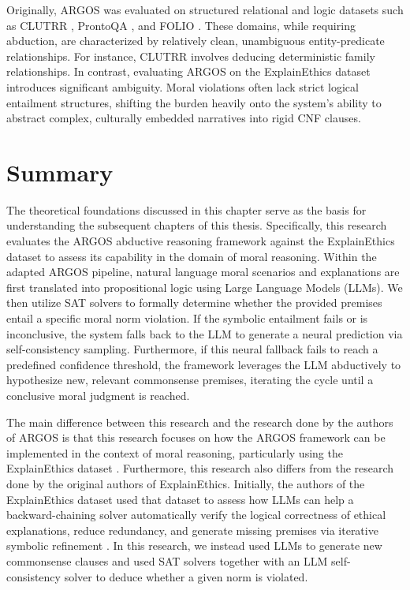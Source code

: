 Originally, ARGOS was evaluated on structured relational and logic datasets such as CLUTRR \citep{sinha-etal-2019-clutrr}, ProntoQA \citep{PrOntoQA}, and FOLIO \citep{han-etal-2024-folio}. These domains, while requiring abduction, are characterized by relatively clean, unambiguous entity-predicate relationships. For instance, CLUTRR involves deducing deterministic family relationships. In contrast, evaluating ARGOS on the ExplainEthics dataset \citep{quan-etal-2024-enhancing} introduces significant ambiguity. Moral violations often lack strict logical entailment structures, shifting the burden heavily onto the system's ability to abstract complex, culturally embedded narratives into rigid CNF clauses.

\section{Summary}
\label{sec:summary}
The theoretical foundations discussed in this chapter serve as the basis for understanding the subsequent chapters of this thesis. Specifically, this research evaluates the ARGOS abductive reasoning framework \citep{cotnareanu2026balanced} against the ExplainEthics dataset \citep{quan2024enhancing} to assess its capability in the domain of moral reasoning. Within the adapted ARGOS pipeline, natural language moral scenarios and explanations are first translated into propositional logic using Large Language Models (LLMs). We then utilize SAT solvers to formally determine whether the provided premises entail a specific moral norm violation. If the symbolic entailment fails or is inconclusive, the system falls back to the LLM to generate a neural prediction via self-consistency sampling. Furthermore, if this neural fallback fails to reach a predefined confidence threshold, the framework leverages the LLM abductively to hypothesize new, relevant commonsense premises, iterating the cycle until a conclusive moral judgment is reached. 

The main difference between this research and the research done by the authors of ARGOS \citep{cotnareanu2026balanced} is that this research focuses on how the ARGOS framework can be implemented in the context of moral reasoning, particularly using the ExplainEthics dataset \citep{quan-etal-2024-enhancing}. Furthermore, this research also differs from the research done by the original authors of ExplainEthics. Initially, the authors of the ExplainEthics dataset used that dataset to assess how LLMs can help a backward-chaining solver automatically verify the logical correctness of ethical explanations, reduce redundancy, and generate missing premises via iterative symbolic refinement \citep{quan-etal-2024-enhancing}. In this research, we instead used LLMs to generate new commonsense clauses and used SAT solvers together with an LLM self-consistency solver to deduce whether a given norm is violated.
